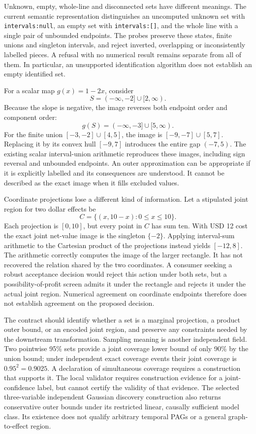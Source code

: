 Unknown, empty, whole-line and disconnected sets have different meanings.
The current semantic representation distinguishes an uncomputed unknown set
with \texttt{intervals:null}, an empty set with \texttt{intervals:[]}, and the
whole line with a single pair of unbounded endpoints. The probes preserve
these states, finite unions and singleton intervals, and reject inverted,
overlapping or inconsistently labelled pieces. A refusal with no numerical
result remains separate from all of them. In particular, an unsupported
identification algorithm does not establish an empty identified set.
\citep{exec16_topology_runtime}

For a scalar map \(g(x)=1-2x\), consider
\[
 S=(-\infty,-2]\cup[2,\infty).
\]
Because the slope is negative, the image reverses both endpoint order and
component order:
\[
 g(S)=(-\infty,-3]\cup[5,\infty).
\]
For the finite union \([-3,-2]\cup[4,5]\), the image is
\([-9,-7]\cup[5,7]\). Replacing it by its convex hull \([-9,7]\) introduces
the entire gap \((-7,5)\). The existing scalar interval-union arithmetic
reproduces these images, including sign reversal and unbounded endpoints.
An outer approximation can be appropriate if it is explicitly labelled and
its consequences are understood. It cannot be described as the exact image
when it fills excluded values.
\citep{exec16_topology_exact}

Coordinate projections lose a different kind of information. Let a stipulated
joint region for two dollar effects be
\[
 C=\{(x,10-x):0\leq x\leq10\}.
\]
Each projection is \([0,10]\), but every point in \(C\) has sum ten. With
USD 12 cost the exact joint net-value image is the singleton \(\{-2\}\).
Applying interval-sum arithmetic to the Cartesian product of the projections
instead yields \([-12,8]\). The arithmetic correctly computes the image of
the larger rectangle. It has not recovered the relation shared by the two
coordinates. A consumer seeking a robust acceptance decision would reject
this action under both sets, but a possibility-of-profit screen admits it
under the rectangle and rejects it under the actual joint region. Numerical
agreement on coordinate endpoints therefore does not establish agreement on
the proposed decision.
\citep{exec16_topology_exact}

The contract should identify whether a set is a marginal projection, a product
outer bound, or an encoded joint region, and preserve any constraints needed
by the downstream transformation. Sampling meaning is another independent
field. Two pointwise 95\% sets provide a joint coverage lower bound of only
90\% by the union bound; under independent exact coverage events their joint
coverage is \(0.95^2=0.9025\). A declaration of simultaneous coverage requires
a construction that supports it. The local validator requires construction
evidence for a joint-confidence label, but cannot certify the validity of
that evidence. The selected three-variable independent Gaussian discovery
construction also returns conservative outer bounds under its restricted
linear, causally sufficient model class. Its existence does not qualify
arbitrary temporal PAGs or a general graph-to-effect region.
\citep{exec16_topology_runtime,exec16_topology_exact,exec16_topology_source}

